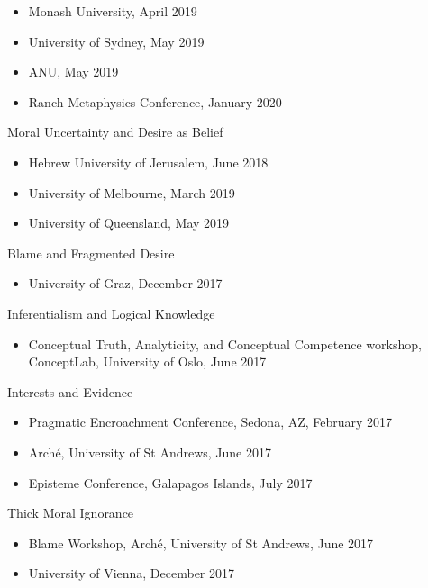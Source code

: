 \documentclass[
  10pt,
  letterpaper,
  DIV=11,
  numbers=noendperiod,
  twoside]{scrartcl}
\providecommand{\tightlist}{%
  \setlength{\itemsep}{0pt}\setlength{\parskip}{0pt}}\usepackage{longtable,booktabs,array}
\begin{document}
\begin{itemize}
\tightlist
\item
  Monash University, April 2019
\item
  University of Sydney, May 2019
\item
  ANU, May 2019
\item
  Ranch Metaphysics Conference, January 2020
\end{itemize}

Moral Uncertainty and Desire as Belief

\begin{itemize}
\tightlist
\item
  Hebrew University of Jerusalem, June 2018
\item
  University of Melbourne, March 2019
\item
  University of Queensland, May 2019
\end{itemize}

Blame and Fragmented Desire

\begin{itemize}
\tightlist
\item
  University of Graz, December 2017
\end{itemize}

\newpage

Inferentialism and Logical Knowledge

\begin{itemize}
\tightlist
\item
  Conceptual Truth, Analyticity, and Conceptual Competence workshop,
  ConceptLab, University of Oslo, June 2017
\end{itemize}

Interests and Evidence

\begin{itemize}
\tightlist
\item
  Pragmatic Encroachment Conference, Sedona, AZ, February 2017
\item
  Arché, University of St Andrews, June 2017
\item
  Episteme Conference, Galapagos Islands, July 2017
\end{itemize}

Thick Moral Ignorance

\begin{itemize}
\tightlist
\item
  Blame Workshop, Arché, University of St Andrews, June 2017
\item
  University of Vienna, December 2017
\end{itemize}
\end{document}
